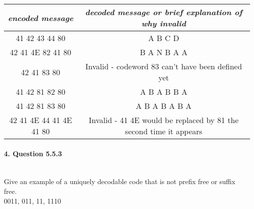 \documentclass{article}
\begin{document}
\begin{tabular}{| c | c |}
\hline
\textit{encoded message} & \textit{decoded message or brief explanation of why invalid}\\ \hline
41 42 43 44 80 & A B C D\\ \hline
42 41 4E 82 41 80 & B A N B A A \\ \hline
42 41 83 80 & Invalid - codeword 83 can't have been defined yet\\ \hline
41 42 81 82 80 & A B A B B A \\ \hline
41 42 81 83 80 & A B A B A B A\\ \hline
42 41 4E 44 41 4E 41 80 & Invalid - 41 4E would be replaced by 81 the second time it appears\\
\hline
\end{tabular}

\paragraph{\Large 4. Question 5.5.3}\mbox{}\\
Give an example of a uniquely decodable code that is not prefix free or suffix free.\\
0011, 011, 11, 1110
\end{document}
